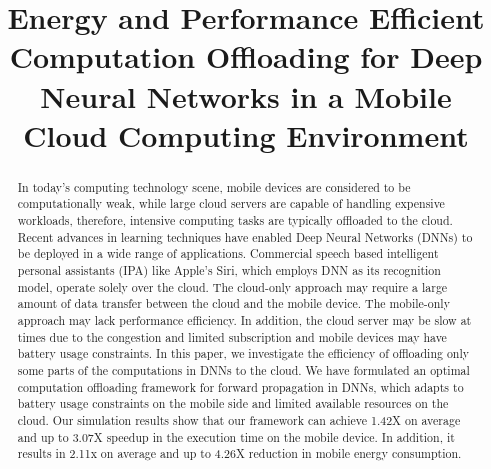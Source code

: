 \documentclass[conference,9pt]{IEEEtran}
\begin{document}
\title{Energy and Performance Efficient Computation Offloading for Deep Neural Networks in a Mobile Cloud Computing Environment \\
}


\author{
\and
{}
\and
}

\maketitle

\begin{abstract}
In today's computing technology scene, mobile devices are considered to be computationally weak, while large cloud servers are capable of handling expensive workloads, therefore, intensive computing tasks are typically offloaded to the cloud. Recent advances in learning techniques have enabled Deep Neural Networks (DNNs) to be deployed in a wide range of applications. Commercial speech based intelligent personal assistants (IPA) like Apple's Siri, which employs DNN as its recognition model, operate solely over the cloud. The cloud-only approach may require a large amount of data transfer between the cloud and the mobile device. The mobile-only approach may lack performance efficiency. In addition, the cloud server may be slow at times due to the congestion and limited subscription and mobile devices may have battery usage constraints. In this paper, we investigate the efficiency of offloading only some parts of the computations in DNNs to the cloud. We have formulated an optimal computation offloading framework for forward propagation in DNNs, which adapts to battery usage constraints on the mobile side and limited available resources on the cloud. Our simulation results show that our framework can achieve 1.42X on average and up to 3.07X speedup in the execution time on the mobile device. In addition, it results in 2.11x on average and up to 4.26X reduction in mobile energy consumption.
\end{abstract}
\end{document}
